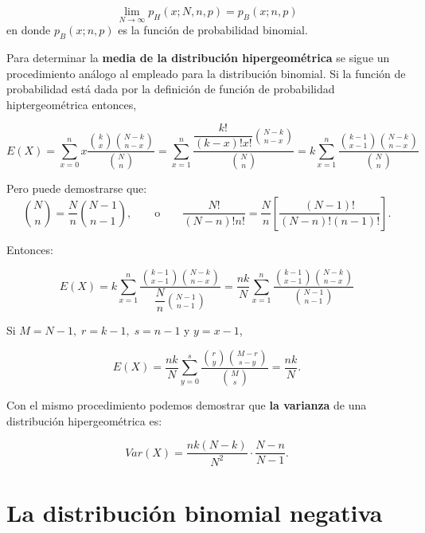 \begin{tcolorbox}
    $$\lim_{N\to \infty} p_H(x;N,n,p) = p_B(x;n,p)$$
    en donde $p_B (x;n,p)$ es la función de probabilidad binomial.
\end{tcolorbox}

Para determinar la \textbf{media de la distribución hipergeométrica} se sigue un procedimiento análogo al empleado para la distribución binomial. Si la función de probabilidad está dada por la definición de función de probabilidad hiptergeométrica entonces,

    $$E(X)=\sum_{x= 0}^n x\dfrac{{k\choose x}{N-k\choose n-x}}{{N\choose n}} = \sum_{x=1}^n \dfrac{\dfrac{k!}{(k-x)!x!}{N-k\choose n-x}}{{N\choose n}}=k\sum_{x=1}^n \dfrac{{k-1\choose x-1}{N-k\choose n-x}}{{N\choose n}}$$

    Pero puede demostrarse que:
    $${N\choose n} = \dfrac{N}{n}{N-1\choose n-1}, \qquad \mbox{o}\qquad \dfrac{N!}{(N-n)!n!}=\dfrac{N}{n}\left[\dfrac{(N-1)!}{(N-n)!(n-1)!}\right].$$

    Entonces:

    $$E(X)=k\sum_{x=1}^n \dfrac{{k-1\choose x-1}{N-k\choose n-x}}{\dfrac{N}{n}{N-1\choose n-1}} = \dfrac{nk}{N}\sum_{x=1}^n \dfrac{{k-1\choose x-1}{N-k\choose n-x}}{{N-1\choose n-1}}$$

    Si $M=N-1,\; r=k-1,\; s=n-1$ y $y=x-1$,

    \begin{tcolorbox}
	$$E(X)=\dfrac{nk}{N} \sum_{y=0}^s \dfrac{{r\choose y}{M-r\choose s-y}}{{M\choose s}} = \dfrac{nk}{N}.$$
    \end{tcolorbox}

Con el mismo procedimiento podemos demostrar que \textbf{la varianza} de una distribución hipergeométrica es:

\begin{tcolorbox}
    $$Var(X)=\dfrac{nk(N-k)}{N^2}\cdot \dfrac{N-n}{N-1}.$$
\end{tcolorbox}

\section{La distribución binomial negativa}

